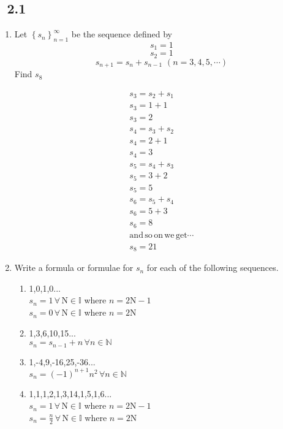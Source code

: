 \documentclass[11pt, letterpaper]{article}
\begin{document}
\subsection{\exr \, 2.1}
\begin{enumerate}
\item Let $\left\lbrace s_n\right\rbrace _ {n=1}^\infty$ be the sequence defined by 
$$s_1 = 1$$
$$s_2 = 1$$
$$s_{n+1} = s_n + s_{n-1} \, \, (n = 3, 4, 5, \cdots) $$
\indent Find $s_8$

\begin{eqnarray*}
s_3 = s_2 + s_1\\
s_3 = 1 + 1\\
s_3 = 2\\
s_4 = s_3 + s_2\\
s_4 = 2 + 1\\
s_4 = 3\\
s_5 = s_4 + s_3\\
s_5 = 3 + 2\\
s_5 = 5\\
s_6 = s_5 + s_4\\
s_6 = 5 + 3\\
s_6 = 8\\
\mathrm{ and \, so \, on \, we \, get} \cdots\\
s_8 = 21
\end{eqnarray*}

\item {Write a formula or formulae for $s_n$ for each of the following sequences.\\
\begin{enumerate}
\item {1,0,1,0...\\
	$s_n = 1 \, \forall \, \mathrm{N} \in \mathbb{I}$ where	$n = 2\mathrm{N}-1$\\
	$s_n = 0 \, \forall \, \mathrm{N} \in \mathbb{I}$ where	$n = 2\mathrm{N}$
}\\
\item {1,3,6,10,15...\\
	$s_n = s_{n-1} + n \, \forall n \in \mathbb{N}$	
}\\
\item {1,-4,9,-16,25,-36...\\
	$s_n = (-1)^{n+1}n^2 \, \forall n \in \mathbb{N}$
}\\
\item {1,1,1,2,1,3,14,1,5,1,6...\\
	$s_n = 1 \, \forall \, \mathrm{N} \in \mathbb{I}$ where	$n = 2\mathrm{N}-1$\\
	$s_n = \frac{n}{2} \, \forall \, \mathrm{N} \in \mathbb{I}$ where	$n = 2\mathrm{N}$
}
	

\end{enumerate}}
\end{enumerate}
\end{document}
